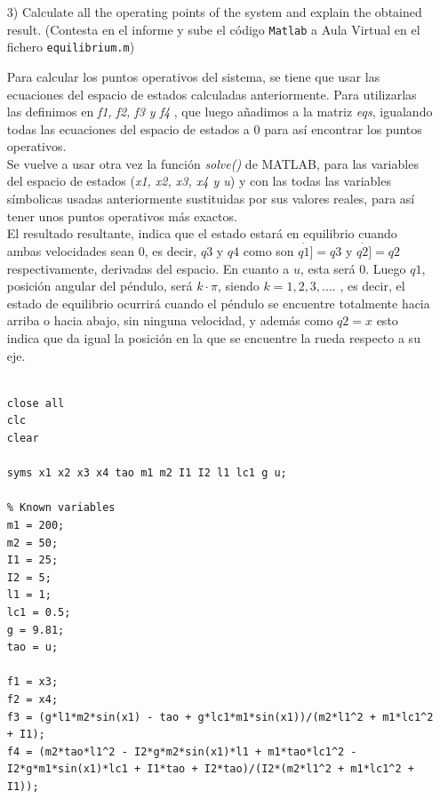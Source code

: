 \documentclass{article}
\begin{document}
\begin{itemize}
\begin{tcolorbox}[width=12cm, title={File \texttt{statespace.m}}]
\begin{scriptsize}
\begin{verbatim}
\end{verbatim}
\end{scriptsize}
\end{tcolorbox}

\item[3)]  {\color{gray} Calculate all the operating points of the system and explain the obtained result. (Contesta en el informe y sube el c\'odigo \texttt{Matlab} a Aula Virtual en el fichero \texttt{equilibrium.m})}

\bigskip

Para calcular los puntos operativos del sistema, se tiene que usar las ecuaciones del espacio de estados calculadas anteriormente. Para utilizarlas las definimos en \textit{f1, f2, f3 y f4} , que luego añadimos a la matriz \textit{eqs}, igualando todas las ecuaciones del espacio de estados a 0 para así encontrar los puntos operativos.\\
Se vuelve a usar otra vez la función \textit{solve()} de MATLAB, para las variables del espacio de estados (\textit{x1, x2, x3, x4 y u}) y con las todas las variables símbolicas usadas anteriormente sustituidas por sus valores reales, para así tener unos puntos operativos más exactos.\\
El resultado resultante, indica que el estado estará en equilibrio cuando ambas velocidades sean 0, es decir, $q{3}$ y $q{4}$ como son $\dot{q{1}]}=q{3}$ y $\dot{q{2}]}=q{2}$ respectivamente, derivadas del espacio. En cuanto a $u$, esta será 0. Luego $q{1}$, posición angular del péndulo, será $k·\pi$, siendo $k=1,2,3,....$ , es decir, el estado de equilibrio ocurrirá cuando el péndulo se encuentre totalmente hacia arriba o hacia abajo, sin ninguna velocidad, y además como $q{2}=x$ esto indica que da igual la posición en la que se encuentre la rueda respecto a su eje.

\bigskip

\begin{tcolorbox}[width=12cm, title={File \texttt{equilibrium.m}}]
\begin{scriptsize}
\begin{verbatim}

close all
clc
clear

syms x1 x2 x3 x4 tao m1 m2 I1 I2 l1 lc1 g u;

% Known variables
m1 = 200;
m2 = 50;
I1 = 25;
I2 = 5;
l1 = 1;
lc1 = 0.5;
g = 9.81;
tao = u;

f1 = x3;
f2 = x4;
f3 = (g*l1*m2*sin(x1) - tao + g*lc1*m1*sin(x1))/(m2*l1^2 + m1*lc1^2 + I1);
f4 = (m2*tao*l1^2 - I2*g*m2*sin(x1)*l1 + m1*tao*lc1^2 - I2*g*m1*sin(x1)*lc1 + I1*tao + I2*tao)/(I2*(m2*l1^2 + m1*lc1^2 + I1));


\end{verbatim}
\end{scriptsize}
\end{tcolorbox}
\end{itemize}
\end{document}
